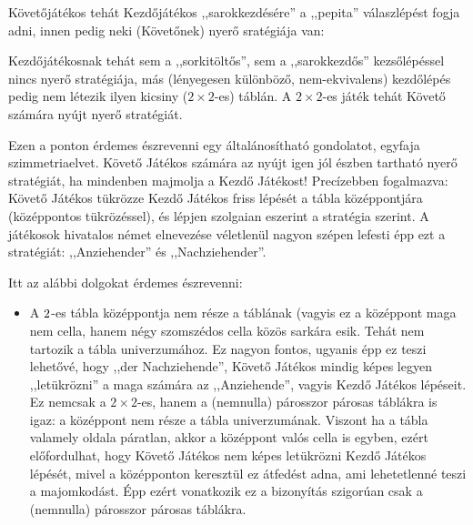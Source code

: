 \documentclass{article}
\newcommand{\anz}[1]{$\mathrm{I}_{#1}$}
\newcommand{\nch}[1]{$\mathrm{II}_{#1}$}
\begin{document}
				Követőjátékos tehát  Kezdőjátékos ,,sarokkezdésére'' a ,,pepita'' válaszlépést fogja adni, innen pedig neki (Követőnek) nyerő sratégiája van:\\

				Kezdőjátékosnak tehát sem a ,,sorkitöltős'', sem a ,,sarokkezdős'' kezsőlépéssel nincs nyerő stratégiája, más (lényegesen különböző, nem-ekvivalens) kezdőlépés pedig nem létezik ilyen kicsiny ($2\times2$-es) táblán. A $2\times2$-es játék tehát Követő számára nyújt nyerő stratégiát.

				Ezen a ponton érdemes észrevenni egy általánosítható gondolatot, egyfaja szimmetriaelvet. Követő Játékos számára az nyújt igen jól észben tartható nyerő stratégiát, ha mindenben majmolja a Kezdő Játékost! Precízebben fogalmazva: Követő Játékos tükrözze Kezdő Játékos friss lépését a tábla középpontjára (középpontos tükrözéssel), és lépjen szolgaian eszerint a stratégia szerint. A játékosok hivatalos német elnevezése véletlenül nagyon szépen lefesti épp ezt a stratégiát: ,,Anziehender'' és ,,Nachziehender''.

				Itt az alábbi dolgokat érdemes észrevenni:
				\begin{itemize}
					\item
					A $2\time2$-es tábla középpontja nem része a táblának (vagyis ez a középpont maga nem cella, hanem négy szomszédos cella közös sarkára esik. Tehát nem tartozik a tábla univerzumához. Ez nagyon fontos, ugyanis épp ez teszi lehetővé, hogy ,,der Nachziehende'', Követő Játékos mindig képes legyen ,,letükrözni'' a maga számára az ,,Anziehende'', vagyis Kezdő Játékos lépéseit. Ez nemcsak a $2\times2$-es, hanem a (nemnulla) párosszor párosas táblákra is igaz: a középpont nem része a tábla univerzumának. Viszont ha a tábla valamely oldala páratlan, akkor a középpont valós cella is egyben, ezért előfordulhat, hogy Követő Játékos nem képes letükrözni Kezdő Játékos lépését, mivel a középponton keresztül ez átfedést adna, ami lehetetlenné teszi a majomkodást. Épp ezért vonatkozik ez a bizonyítás szigorúan csak a (nemnulla) párosszor párosas táblákra.
				\end{itemize}
\end{document}
